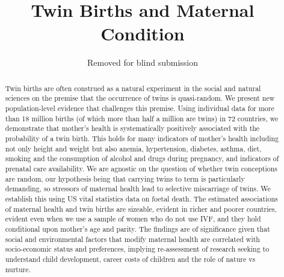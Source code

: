 \documentclass{nature}
\title{Twin Births and Maternal Condition}
\author{Removed for blind submission}
\begin{document}
\maketitle
\vspace{8mm}

\begin{linenumbers}  
\begin{abstract}
Twin births are often construed as a natural experiment in the social and natural sciences on the premise that the occurrence of twins is quasi-random.\cite{Thorndike1905,Boomsmaetal2002,Poldermanetal2015,Phillips1993,BouchardPropping1993,McClearnetal1997,Nisen2013,WolpinRosenzweig2000,RosenzweigWolpin1980,BronarsGrogger1994} We present new population-level evidence that challenges this premise. Using individual data for more than 18 million births (of which more than half a million are twins) in 72 countries, we demonstrate that mother's health is systematically positively associated with the probability of a twin birth. This holds for many indicators of mother's health including not only height and weight but also anemia, hypertension, diabetes, asthma, diet, smoking and the consumption of alcohol and drugs during pregnancy, and indicators of prenatal care availability. We are agnostic on the question of whether twin conceptions are random, our hypothesis being that carrying twins to term is particularly demanding, so stressors of maternal health lead to selective miscarriage of twins. We establish this using US vital statistics data on foetal death. The estimated associations of maternal health and twin births are sizeable, evident in richer and poorer countries, evident even when we use a sample of women who do not use IVF, and they hold conditional upon mother's age and parity. The findings are of significance given that social and environmental factors that modify maternal health are correlated with socio-economic status and preferences, implying re-assessment of research seeking to understand child development, career costs of children and the role of nature vs nurture.
\end{abstract}


\end{linenumbers}
\end{document}
